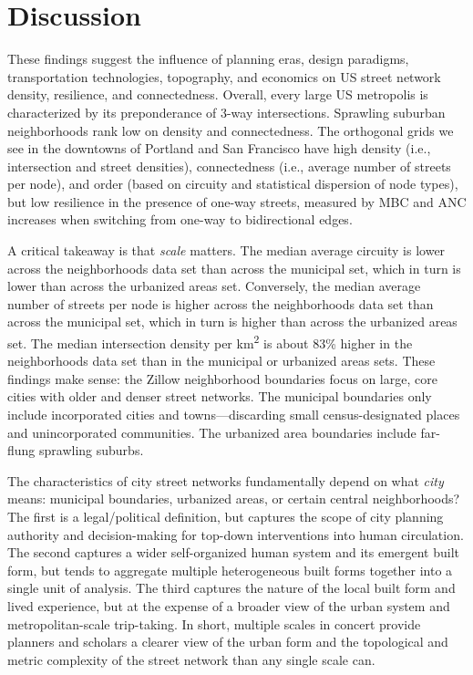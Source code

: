 \documentclass{article}
\begin{document}
\section{Discussion}

These findings suggest the influence of planning eras, design paradigms, transportation technologies, topography, and economics on US street network density, resilience, and connectedness. Overall, every large US metropolis is characterized by its preponderance of 3-way intersections. Sprawling suburban neighborhoods rank low on density and connectedness. The orthogonal grids we see in the downtowns of Portland and San Francisco have high density (i.e., intersection and street densities), connectedness (i.e., average number of streets per node), and order (based on circuity and statistical dispersion of node types), but low resilience in the presence of one-way streets, measured by MBC and ANC increases when switching from one-way to bidirectional edges.

A critical takeaway is that \emph{scale} matters. The median average circuity is lower across the neighborhoods data set than across the municipal set, which in turn is lower than across the urbanized areas set. Conversely, the median average number of streets per node is higher across the neighborhoods data set than across the municipal set, which in turn is higher than across the urbanized areas set. The median intersection density per km\textsuperscript{2} is about 83\% higher in the neighborhoods data set than in the municipal or urbanized areas sets. These findings make sense: the Zillow neighborhood boundaries focus on large, core cities with older and denser street networks. The municipal boundaries only include incorporated cities and towns---discarding small census-designated places and unincorporated communities. The urbanized area boundaries include far-flung sprawling suburbs.

The characteristics of city street networks fundamentally depend on what \emph{city} means: municipal boundaries, urbanized areas, or certain central neighborhoods? The first is a legal/political definition, but captures the scope of city planning authority and decision-making for top-down interventions into human circulation. The second captures a wider self-organized human system and its emergent built form, but tends to aggregate multiple heterogeneous built forms together into a single unit of analysis. The third captures the nature of the local built form and lived experience, but at the expense of a broader view of the urban system and metropolitan-scale trip-taking. In short, multiple scales in concert provide planners and scholars a clearer view of the urban form and the topological and metric complexity of the street network than any single scale can.
\end{document}
